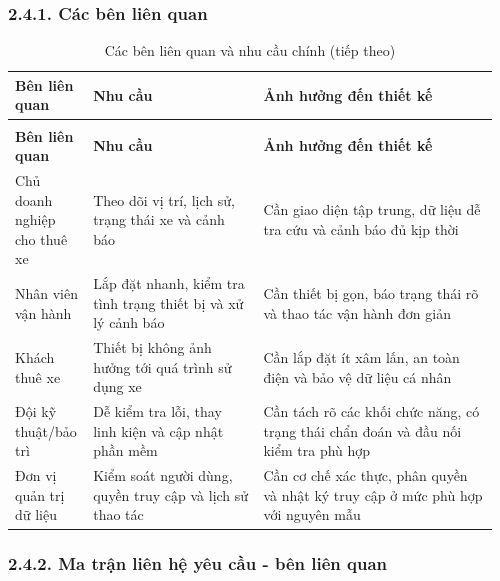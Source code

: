 \documentclass[a4paper]{extarticle}
\newcommand{\thesissettableid}[2]{%
  \renewcommand{\thetable}{#1}%
  \renewcommand{\theHtable}{#2}%
}
\begin{document}
\subsubsection{2.4.1. Các bên liên quan}\label{cuxe1c-buxean-liuxean-quan}

{\thesissettableid{2.8}{condensed-bang-2-8-cac-ben-lien-quan-va-nhu-cau-chinh}
\def\LTcaptype{table}
\begin{longtable}{|L{0.143\linewidth}|L{0.341\linewidth}|L{0.475\linewidth}|}
\caption{Các bên liên quan và nhu cầu chính}\label{tab:condensed-bang-2-8-cac-ben-lien-quan-va-nhu-cau-chinh}\\
\hline
\textbf{Bên liên quan} & \textbf{Nhu cầu} & \textbf{Ảnh hưởng đến thiết kế} \\
\hline
\endfirsthead
\caption[]{Các bên liên quan và nhu cầu chính (tiếp theo)}\\
\hline
\textbf{Bên liên quan} & \textbf{Nhu cầu} & \textbf{Ảnh hưởng đến thiết kế} \\
\hline
\endhead
\endfoot
\endlastfoot
Chủ doanh nghiệp cho thuê xe & Theo dõi vị trí, lịch sử, trạng thái xe và cảnh báo & Cần giao diện tập trung, dữ liệu dễ tra cứu và cảnh báo đủ kịp thời \\\hline
Nhân viên vận hành & Lắp đặt nhanh, kiểm tra tình trạng thiết bị và xử lý cảnh báo & Cần thiết bị gọn, báo trạng thái rõ và thao tác vận hành đơn giản \\\hline
Khách thuê xe & Thiết bị không ảnh hưởng tới quá trình sử dụng xe & Cần lắp đặt ít xâm lấn, an toàn điện và bảo vệ dữ liệu cá nhân \\\hline
Đội kỹ thuật/bảo trì & Dễ kiểm tra lỗi, thay linh kiện và cập nhật phần mềm & Cần tách rõ các khối chức năng, có trạng thái chẩn đoán và đầu nối kiểm tra phù hợp \\\hline
Đơn vị quản trị dữ liệu & Kiểm soát người dùng, quyền truy cập và lịch sử thao tác & Cần cơ chế xác thực, phân quyền và nhật ký truy cập ở mức phù hợp với nguyên mẫu \\\hline
\end{longtable}
}

\subsubsection{2.4.2. Ma trận liên hệ yêu cầu - bên liên quan}\label{ma-trux1eadn-liuxean-hux1ec7-yuxeau-cux1ea7u---buxean-liuxean-quan}
\end{document}
